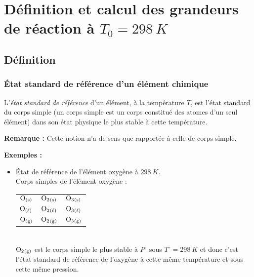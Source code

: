 \documentclass{article}
\begin{document}
\section{Définition et calcul des grandeurs de réaction à $T_0= \SI{298}{K}$}
\subsection{Définition}
\subsubsection{État standard de référence d’un élément chimique}
\begin{enonce}
    L'\textit{état standard de référence} d'un élément, à la température $T$, est l'état standard du corps simple (un corps simple est un corps constitué des atomes d'un seul élément) dans son état physique le plus stable à cette température.
\end{enonce}
\begin{tableau}
    \textbf{Remarque :} Cette notion n'a de sens que rapportée à celle de corps simple.
    
    \textbf{Exemples :}
    \begin{itemize}
        \item État de référence de l'élément oxygène à $\SI{298}{K}$.\\
        Corps simples de l'élément oxygène :
\begin{tabular}{l|l|l}
$\ce{O_{(s)}}$    & $\ce{O2_{(s)}}$    & $\ce{O3_{(s)}}$    \\
$\ce{O_{(\ell)}}$ & $\ce{O2_{(\ell)}}$ & $\ce{O3_{(\ell)}}$ \\
$\ce{O_{(g)}}$    & $\ce{O2_{(g)}}$    & $\ce{O3_{(g)}}$   
\end{tabular}\\[5pt]
    $\ce{O2_{(g)}}$ est le corps simple le plus stable à $P^\circ$ sous $T^\circ = \SI{298}{K}$ et donc c'est l'état standard de référence de l'oxygène à cette même température et sous cette même pression.
    \end{itemize}
\end{tableau}
\end{document}
